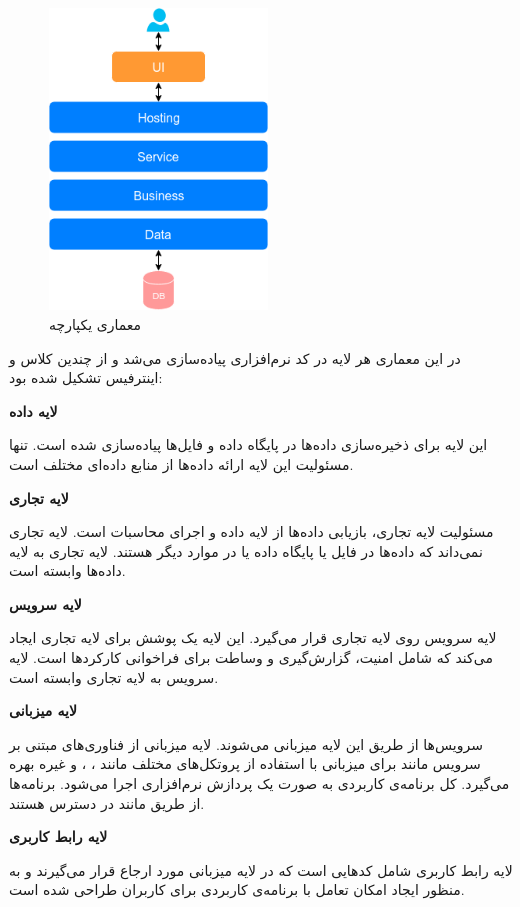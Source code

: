 \begin{figure}[!h]
	\centering
	\includegraphics[height=8cm]{images/monolithic-architecture}
	\caption{معماری یکپارچه}
	\label{monolithic}
\end{figure}

در این معماری هر لایه در کد نرم‌افزاری پیاده‌سازی می‌شد و از چندین کلاس و اینترفیس تشکیل شده بود:

\textbf{لایه داده}

این لایه برای ذخیره‌سازی داده‌ها در پایگاه داده و فایل‌ها پیاده‌سازی شده است. تنها مسئولیت این لایه ارائه داده‌ها از منابع داده‌ای مختلف است.

\textbf{لایه تجاری}

مسئولیت لایه تجاری، بازیابی داده‌ها از لایه داده و اجرای محاسبات است. لایه تجاری نمی‌داند که داده‌ها در فایل یا پایگاه داده یا در موارد دیگر هستند. لایه تجاری به لایه داده‌ها وابسته است.

\textbf{لایه سرویس}

لایه سرویس روی لایه تجاری قرار می‌گیرد. این لایه یک پوشش برای لایه تجاری ایجاد می‌کند که شامل امنیت، گزارش‌گیری و وساطت برای فراخوانی کارکردها است. لایه سرویس به لایه تجاری وابسته است.

\textbf{لایه میزبانی}

سرویس‌ها از طریق این لایه میزبانی می‌شوند. لایه میزبانی از فناوری‌های مبتنی بر سرویس مانند  برای میزبانی با استفاده از پروتکل‌های مختلف مانند  ، ، و غیره بهره می‌گیرد. کل برنامه‌ی کاربردی به صورت یک پردازش نرم‌افزاری اجرا می‌شود. برنامه‌‌ها از طریق  مانند  در دسترس هستند.

\textbf{لایه رابط کاربری}

لایه رابط کاربری شامل کدهایی است که در لایه میزبانی مورد ارجاع قرار می‌گیرند و به منظور ایجاد امکان تعامل با برنامه‌ی کاربردی برای کاربران طراحی شده است.

